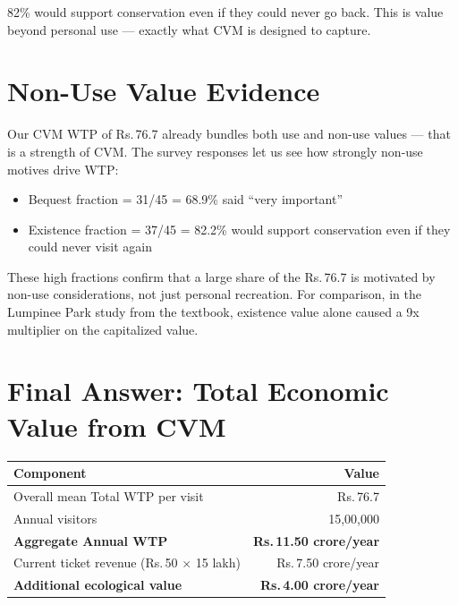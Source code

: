 \documentclass[11pt, a4paper]{article}
\newcommand{\rupee}{Rs.\,}
\begin{document}
82\% would support conservation even if they could never go back. This is value beyond personal use --- exactly what CVM is designed to capture.

\section{Non-Use Value Evidence}

Our CVM WTP of \rupee 76.7 already bundles both use and non-use values --- that is a strength of CVM. The survey responses let us see how strongly non-use motives drive WTP:

\begin{itemize}[nosep]
    \item Bequest fraction = 31/45 = 68.9\% said ``very important''
    \item Existence fraction = 37/45 = 82.2\% would support conservation even if they could never visit again
\end{itemize}

These high fractions confirm that a large share of the \rupee 76.7 is motivated by non-use considerations, not just personal recreation. For comparison, in the Lumpinee Park study from the textbook, existence value alone caused a 9x multiplier on the capitalized value.

\section{Final Answer: Total Economic Value from CVM}

\begin{table}[h]
\centering
\begin{tabular}{lr}
\toprule
\textbf{Component} & \textbf{Value} \\
\midrule
Overall mean Total WTP per visit & \rupee 76.7 \\
Annual visitors & 15,00,000 \\
\textbf{Aggregate Annual WTP} & \textbf{\rupee 11.50 crore/year} \\
\midrule
Current ticket revenue (\rupee 50 $\times$ 15 lakh) & \rupee 7.50 crore/year \\
\textbf{Additional ecological value} & \textbf{\rupee 4.00 crore/year} \\
\bottomrule
\end{tabular}
\end{table}
\end{document}
